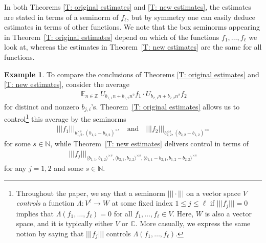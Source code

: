 \documentclass[11pt]{amsart}
\theoremstyle{definition}
\newtheorem{example}[lemma]{Example}
\DeclareMathOperator*{\E}{\mathbb{E}}
\newcommand{\C}{{\mathbb C}}
\newcommand{\N}{{\mathbb N}}
\newcommand{\Z}{{\mathbb Z}}
\newcommand{\nnorm}[1]{\lvert\!|\!| #1|\!|\!\rvert}
\newcommand{\1}{{\mathbf{1}}}
\begin{document}
In both Theorems \ref{T: original estimates} and \ref{T: new estimates}, the estimates are stated in terms of a seminorm of $f_\ell$, but by symmetry one can easily deduce estimates in terms of other functions. We note that the box seminorms appearing in Theorem~\ref{T: original estimates} depend on which of the functions $f_1, \ldots, f_\ell$ we look at, whereas the estimates in Theorem~\ref{T: new estimates} are the same for all functions. 


\begin{example}
    To compare the conclusions of Theorems \ref{T: original estimates} and \ref{T: new estimates}, 
    consider the average
    \begin{align*}
        \E_{n\in\Z}U_{b_{1,1} n+ b_{1,2} n^2}f_1\cdot U_{b_{2,1}n + b_{2,2}n^2}f_2
    \end{align*}
    for distinct and nonzero $b_{j,i}$'s.
    Theorem~\ref{T: original estimates} allows us to control\footnote{Throughout the paper, we say that a seminorm $\nnorm{\cdot}$ on a vector space $V$ \textit{controls} a function $\Lambda\colon V^\ell\to W$ at some fixed index $1\leq j\leq \ell$ if $\nnorm{f_j} = 0$ implies that $\Lambda(f_1, \ldots, f_\ell) = 0$ for all $f_1, \ldots, f_\ell\in V$. Here, $W$ is also a vector space, and it is typically either $V$ or $\C$. More casually, we express the same notion by saying that $\nnorm{f_j}$ controls $\Lambda(f_1, \ldots, f_\ell)$.} this average by the seminorms 
    \begin{align*}
        \nnorm{f_1}_{b_{1,2}^{\times s}, (b_{1,2}-b_{2,2})^{\times s}}\quad \textrm{and}\quad \nnorm{f_2}_{b_{2,2}^{\times s}, (b_{2,2}-b_{1,2})^{\times s}}
    \end{align*}
    for some $s\in\N$, while Theorem~\ref{T: new estimates} delivers control in terms of
    \begin{align*}
        \nnorm{f_j}_{\langle b_{1,1}, b_{1,2}\rangle^{\times s}, \langle b_{2,1}, b_{2,2}\rangle^{\times s}, \langle b_{1,1}-b_{2,1}, b_{1,2}-b_{2,2}\rangle^{\times s}}
    \end{align*}
    for any $j=1,2$ and some $s\in\N$.
\end{example}
\end{document}

